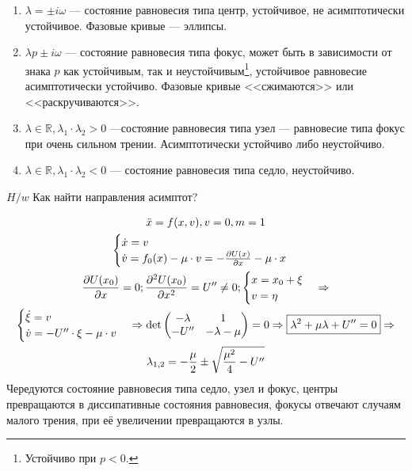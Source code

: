 \begin{enumerate}
\item $\lambda = \pm i \omega$ --- состояние равновесия типа центр, устойчивое, не асимптотически устойчивое. Фазовые кривые --- эллипсы.
\item $\lambda p \pm i \omega$ --- состояние равновесия типа фокус, может быть в зависимости от знака $p$ как устойчивым, так и неустойчивым\footnote{Устойчиво при $p < 0$.}, устойчивое равновесие асимптотически устойчиво. Фазовые кривые <<сжимаются>> или <<раскручиваются>>.
\item $\lambda \in \mathbb{R}, \lambda_1 \cdot \lambda_2 > 0$ ---состояние равновесия типа узел --- равновесие типа фокус при очень сильном трении. Асимптотически устойчиво либо неустойчиво.
\item $\lambda \in \mathbb{R}, \lambda_1 \cdot \lambda_2 < 0$ --- состояние равновесия типа седло, неустойчиво.
\end{enumerate}
$H/w$ Как найти направления асимптот?

\begin{ex}
\begin{gather}
\ddot{x} = f(x, v), v =0, m = 1 \\
\begin{cases}
\dot{x} = v\\
\dot{v} = f_0(x) - \mu \cdot v = - \pdv{U(x)}{x} - \mu \cdot x
\end{cases}\\
\pdv{U(x_0)}{x} = 0; \pdv[2]{U(x_0)}{x} = U'' \neq 0; \begin{cases}
x = x_0 + \xi\\
v = \eta
\end{cases}
\Rightarrow\\
\begin{cases}
\dot{\xi} = v\\
\dot{v} = -U'' \cdot \xi - \mu \cdot v
\end{cases} \Rightarrow 
\det \begin{pmatrix}
-\lambda & 1\\
-U'' & -\lambda - \mu
\end{pmatrix} = 0 \Rightarrow \boxed{\lambda^2 + \mu \lambda + U'' = 0} \Rightarrow \\
\lambda_{1, 2} = - \frac{\mu}{2} \pm \sqrt{\frac{\mu^2}{4} - U''}
\end{gather}
Чередуются состояние равновесия типа седло, узел и фокус, центры превращаются в диссипативные состояния равновесия, фокусы отвечают случаям малого трения, при её увеличении превращаются в узлы.
\end{ex}

